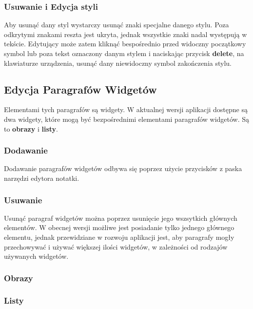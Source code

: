 \subsubsection{Usuwanie i Edycja styli}

Aby usunąć dany styl wystarczy usunąć znaki specjalne danego stylu. Poza odkrytymi znakami reszta jest ukryta, jednak wszystkie znaki nadal występują w tekście. Edytujący może zatem kliknąć bespośrednio przed widoczny początkowy symbol lub poza tekst oznaczony danym stylem i naciskając przycisk \textbf{delete}, na klawiaturze urządzenia, usunąć dany niewidoczny symbol zakończenia stylu.

\pagebreak

\subsection{Edycja Paragrafów Widgetów}

Elementami tych paragrafów są widgety. W aktualnej wersji aplikacji dostępne są dwa widgety, które mogą być bezpośrednimi elementami paragrafów widgetów.
Są to \textbf{obrazy} i \textbf{listy}.

\subsubsection{Dodawanie}

Dodawanie paragrafów widgetów odbywa się poprzez użycie przycisków z paska narzędzi edytora notatki.

\subsubsection{Usuwanie}

Usunąć paragraf widgetów można poprzez usunięcie jego wszsytkich głównych elementów. W obecnej wersji możliwe jest posiadanie tylko jednego głównego elementu, jednak przewidziane w rozwoju aplikacji jest, aby paragrafy mogły przechowywać i używać większej ilości widgetów, w zależności od rodzajów używanych widgetów.

\subsubsection{Obrazy}


\subsubsection{Listy}